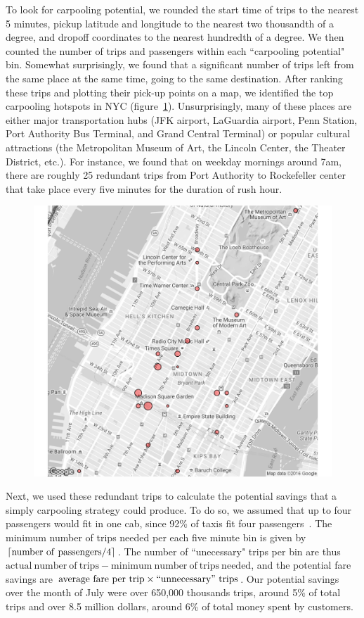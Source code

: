 \documentclass[twocolumn]{article}
\DeclarePairedDelimiter{\ceil}{\lceil}{\rceil}
\begin{document}
To look for carpooling potential, we rounded the start time of trips to the nearest 5 minutes, pickup latitude and longitude to the nearest two thousandth of a degree, and dropoff coordinates to the nearest hundredth of a degree. We then counted the number of trips and passengers within each ``carpooling potential" bin. Somewhat surprisingly, we found that a significant number of trips left from the same place at the same time, going to the same destination. After ranking these trips and plotting their pick-up points on a map, we identified the top carpooling hotspots in NYC (figure~\ref{fig:hotspots}). Unsurprisingly, many of these places are either major transportation hubs (JFK airport, LaGuardia airport, Penn Station, Port Authority Bus Terminal, and Grand Central Terminal) or popular cultural attractions (the Metropolitan Museum of Art, the Lincoln Center, the Theater District, etc.). For instance, we found that on weekday mornings around 7am, there are roughly 25 redundant trips from Port Authority to Rockefeller center that take place every five minutes for the duration of rush hour.
\begin{figure}[h]
  \centering
  \includegraphics[width=.9\linewidth]{top_25_hotspots}
  \label{fig:hotspots}
\end{figure}

Next, we used these redundant trips to calculate the potential savings that a simply carpooling strategy could produce. To do so, we assumed that up to four passengers would fit in one cab, since 92\% of taxis fit four passengers~\cite{TLC:2007}. The minimum number of trips needed per each five minute bin is given by $\ceil{\mathrm{number~of~passengers} / 4}$. The number of ``unecessary" trips per bin are thus $\mathrm{actual~number~of~trips} - \mathrm{minimum~number~of~trips~needed}$, and the potential fare savings are $\mathrm{average~fare~per~trip}\times\mathrm{``unnecessary"~trips}$. Our potential savings over the month of July were over 650,000 thousands trips, around 5\% of total trips and over 8.5 million dollars, around 6\% of total money spent by customers.
\end{document}
